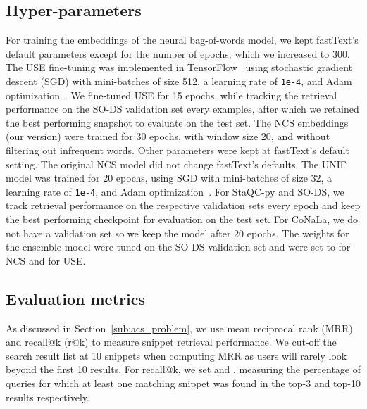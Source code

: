 \documentclass[12pt,conference, onecolumn]{IEEEtran}
\begin{document}
\subsection{Hyper-parameters}
For training the embeddings of the neural bag-of-words model, we kept fastText's default parameters except for the number of epochs, which we increased to 300. The USE fine-tuning was implemented in TensorFlow~\cite{tensorflow2015-whitepaper}  using stochastic gradient descent (SGD) with mini-batches of size 512, a learning rate of \texttt{1e-4}, and Adam optimization~\cite{Kingma2014}. We fine-tuned USE for 15 epochs, while tracking the retrieval performance on the SO-DS validation set every  examples, after which we retained the best performing snapshot to evaluate on the test set. The NCS embeddings (our version) were trained for 30 epochs, with window size 20, and without filtering out infrequent words. Other parameters were kept at fastText's default setting. The original NCS model did not change fastText's defaults. The UNIF model was trained for 20 epochs, using SGD with mini-batches of size 32, a learning rate of \texttt{1e-4}, and Adam optimization~\cite{Kingma2014}. For StaQC-py and SO-DS, we track retrieval performance on the respective validation sets every epoch and keep the best performing checkpoint for evaluation on the test set.  For CoNaLa, we do not have a validation set so we keep the model after 20 epochs. The  weights for the ensemble model were tuned on the SO-DS validation set and were set to   for NCS and  for USE.

\subsection{Evaluation metrics}
As discussed in Section~\ref{sub:acs_problem}, we use mean reciprocal rank (MRR) and recall@k (r@k) to measure snippet retrieval performance. We cut-off the search result list at 10 snippets when computing MRR as users will rarely look beyond the first 10 results. For recall@k, we set  and , measuring the percentage of queries for which at least one matching snippet was found in the top-3 and top-10 results respectively. 
\end{document}
